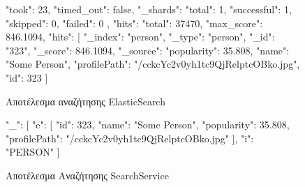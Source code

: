 \begin{figure}[H]
    \begin{jsoncode}
{
    "took": 23,
    "timed_out": false,
    "_shards": {
        "total": 1,
        "successful": 1,
        "skipped": 0,
        "failed": 0
    },
    "hits": {
        "total": 37470,
        "max_score": 846.1094,
        "hits": [{
            "_index": "person",
            "_type": "person",
            "_id": "323",
            "_score": 846.1094,
            "_source": {
                "popularity": 35.808,
                "name": "Some Person",
                "profilePath": "/cckcYc2v0yh1tc9QjRelptcOBko.jpg",
                "id": 323
            }
        }]
    }
}
    \end{jsoncode}
    \caption{Αποτέλεσμα αναζήτησης ElasticSearch}
   \label{result:es}
\end{figure}
\begin{figure}[H]
    \begin{jsoncode}
{
    "_": [{
        "e": [{
            "id": 323,
            "name": "Some Person",
            "popularity": 35.808,
            "profilePath": "/cckcYc2v0yh1tc9QjRelptcOBko.jpg"
        }],
        "i": "PERSON"
    }]
}
    \end{jsoncode}
    \caption{Αποτέλεσμα Αναζήτησης SearchService}
   \label{result:ss}
\end{figure}
